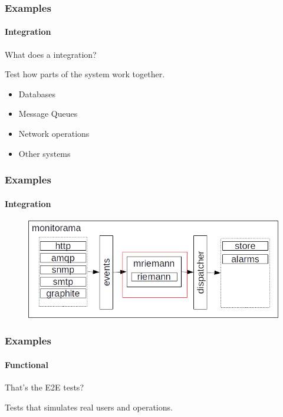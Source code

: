 \documentclass{beamer}
\begin{document}
  \begin{frame}
    \frametitle{Examples}
    \framesubtitle{Integration}
    
    \begin{block}{}      
    What does a integration? \pause
    \end{block}
    
    \begin{alertblock}{}
    Test how parts of the system work together.
    \end{alertblock}
    
    \begin{examples}
    \begin{itemize}
    \item Databases
    \item Message Queues
    \item Network operations
    \item Other systems    
    \end{itemize}

    \end{examples}
        
  \end{frame}
  
  \begin{frame}
    \frametitle{Examples}
    \framesubtitle{Integration}
    
    \begin{figure}[t]
    \includegraphics[scale=0.5]{img/ex1.png}
    \centering
    \end{figure}
    
  \end{frame}

  \begin{frame}
    \frametitle{Examples}
    \framesubtitle{Functional}
    
    \begin{block}{}      
    That's the E2E tests? \pause
    \end{block}
    
    \begin{alertblock}{}
    Tests that simulates real users and operations.
    \end{alertblock}
        
  \end{frame}
  
\end{document}
